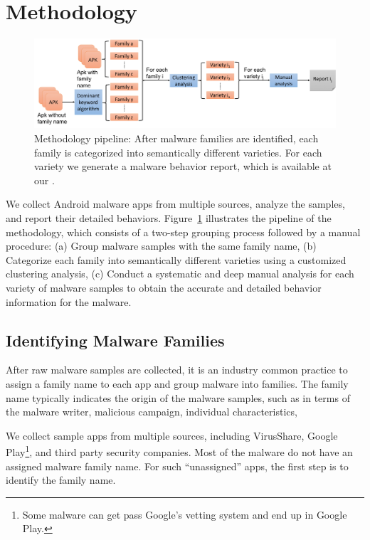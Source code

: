\section{Methodology}
\label{sec:data}

\vspace{-.3in}
\begin{figure}[h]
\centering
\includegraphics[width=4.5in]{fig/method-pipe.png}
\caption{Methodology pipeline: 
After malware families are identified, each family is categorized into semantically different varieties.
For each variety we generate a malware behavior report,
which is available at our \amd.}
\label{fig:methodpipe}
\end{figure}

We collect Android malware apps from multiple sources, analyze the samples, and report their detailed
behaviors.
Figure~\ref{fig:methodpipe} illustrates the pipeline of the methodology, which consists of
a two-step grouping process
followed by a manual procedure:
(a) Group malware samples with the same family name, 
(b) Categorize each family into semantically different varieties using a customized clustering analysis,
(c) Conduct a systematic and deep manual analysis for each variety of malware samples to obtain the accurate
    and detailed behavior information for the malware.

\subsection{Identifying Malware Families}
\label{sec:data:family}

After raw malware samples are collected, it is an industry common practice to assign a family name
to each app and group malware into families. The family name typically indicates the origin of the 
malware samples, such as in terms of the malware writer, malicious campaign, individual characteristics, \etc


We collect sample apps from multiple sources, including
VirusShare, Google Play\footnote{Some malware can get pass Google's vetting system and end up in Google Play.},
and third party security companies.
Most of the malware do not have an assigned malware family name.
For such ``unassigned'' apps, the first step is to identify the family name.

